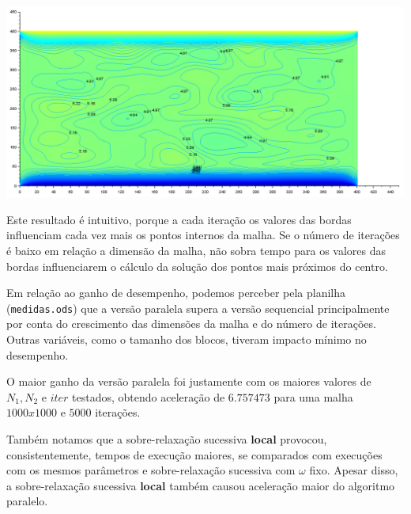 \documentclass[a4paper,landscape,11pt]{article}
\begin{document}
\includegraphics[width=\textwidth]{images/grafico_errado}

Este resultado é intuitivo, porque a cada iteração os valores das bordas influenciam cada vez mais os pontos internos da malha. Se o número de iterações é baixo em relação a dimensão da malha, não sobra tempo para os valores das bordas influenciarem o cálculo da solução dos pontos mais próximos do centro.

Em relação ao ganho de desempenho, podemos perceber pela planilha (\texttt{medidas.ods}) que a versão paralela supera a versão sequencial principalmente por conta do crescimento das dimensões da malha e do número de iterações. Outras variáveis, como o tamanho dos blocos, tiveram impacto mínimo no desempenho.

O maior ganho da versão paralela foi justamente com os maiores valores de $N_1, N_2$ e $iter$ testados, obtendo aceleração de $6.757473$ para uma malha $1000x1000$ e $5000$ iterações.

Também notamos que a sobre-relaxação sucessiva \textbf{local} provocou, consistentemente, tempos de execução maiores, se comparados com execuções com os mesmos parâmetros e sobre-relaxação sucessiva com $\omega$ fixo. Apesar disso, a sobre-relaxação sucessiva \textbf{local} também causou aceleração maior do algoritmo paralelo.
\end{document}
